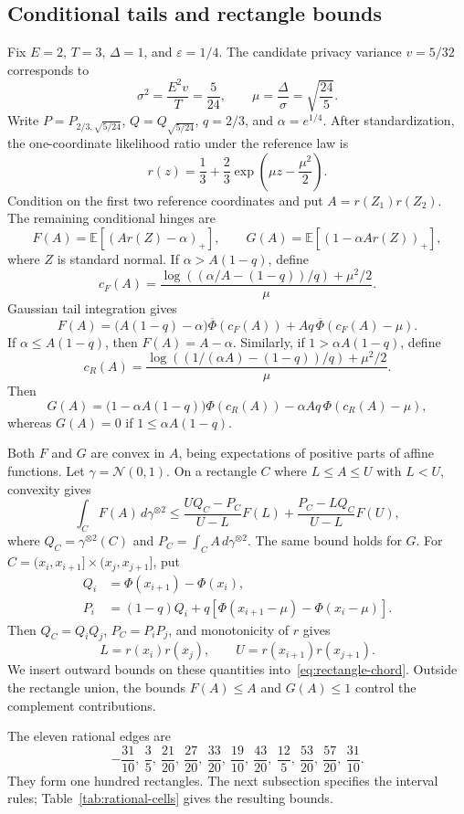 \documentclass[11pt]{article}
\theoremstyle{remark}
\newcommand{\E}{\mathbb E}
\newcommand{\Normal}{\mathcal N}
\begin{document}
\subsection{Conditional tails and rectangle bounds}
Fix $E=2$, $T=3$, $\Delta=1$, and $\varepsilon=1/4$. The candidate
privacy variance $v=5/32$ corresponds to
\[
 \sigma^2=\frac{E^2v}{T}=\frac5{24},\qquad
 \mu=\frac\Delta\sigma=\sqrt{\frac{24}{5}}.
\]
Write $P=P_{2/3,\sqrt{5/24}}$, $Q=Q_{\sqrt{5/24}}$, $q=2/3$, and
$\alpha=e^{1/4}$. After standardization, the one-coordinate likelihood ratio
under the reference law is
\[
 r(z)=\frac13+\frac23\exp\left(\mu z-\frac{\mu^2}{2}\right).
\]
Condition on the first two reference coordinates and put
$A=r(Z_1)r(Z_2)$. The remaining conditional hinges are
\[
 F(A)=\E[(Ar(Z)-\alpha)_+],\qquad
 G(A)=\E[(1-\alpha Ar(Z))_+],
\]
where $Z$ is standard normal. If $\alpha>A(1-q)$, define
\[
 c_F(A)=\frac{\log((\alpha/A-(1-q))/q)+\mu^2/2}{\mu}.
\]
Gaussian tail integration gives
\[
 F(A)=\bigl(A(1-q)-\alpha\bigr)\overline\Phi(c_F(A))
       +Aq\,\overline\Phi(c_F(A)-\mu).
\]
If $\alpha\leq A(1-q)$, then $F(A)=A-\alpha$. Similarly, if
$1>\alpha A(1-q)$, define
\[
 c_R(A)=\frac{\log((1/(\alpha A)-(1-q))/q)+\mu^2/2}{\mu}.
\]
Then
\[
 G(A)=\bigl(1-\alpha A(1-q)\bigr)\Phi(c_R(A))
       -\alpha Aq\,\Phi(c_R(A)-\mu),
\]
whereas $G(A)=0$ if $1\leq\alpha A(1-q)$.

Both $F$ and $G$ are convex in $A$, being expectations of positive parts of
affine functions. Let $\gamma=\Normal(0,1)$. On a rectangle $C$ where
$L\leq A\leq U$ with $L<U$, convexity gives
\begin{equation}\label{eq:rectangle-chord}
 \int_C F(A)\,d\gamma^{\otimes2}
 \leq\frac{UQ_C-P_C}{U-L}F(L)
      +\frac{P_C-LQ_C}{U-L}F(U),
\end{equation}
where $Q_C=\gamma^{\otimes2}(C)$ and
$P_C=\int_C A\,d\gamma^{\otimes2}$. The same bound holds for $G$.
For $C=(x_i,x_{i+1}]\times(x_j,x_{j+1}]$, put
\begin{align*}
 Q_i&=\Phi(x_{i+1})-\Phi(x_i),\\
 P_i&=(1-q)Q_i+q[\Phi(x_{i+1}-\mu)-\Phi(x_i-\mu)].
\end{align*}
Then $Q_C=Q_iQ_j$, $P_C=P_iP_j$, and monotonicity of $r$ gives
\[
 L=r(x_i)r(x_j),\qquad U=r(x_{i+1})r(x_{j+1}).
\]
We insert outward bounds on these quantities into~\eqref{eq:rectangle-chord}.
Outside the rectangle union, the bounds $F(A)\leq A$ and $G(A)\leq1$ control
the complement contributions.

The eleven rational edges are
\[
 -\frac{31}{10},\ \frac35,\ \frac{21}{20},\ \frac{27}{20},\
 \frac{33}{20},\ \frac{19}{10},\ \frac{43}{20},\ \frac{12}{5},\
 \frac{53}{20},\ \frac{57}{20},\ \frac{31}{10}.
\]
They form one hundred rectangles. The next subsection specifies the
interval rules; Table~\ref{tab:rational-cells} gives the resulting bounds.
\end{document}
